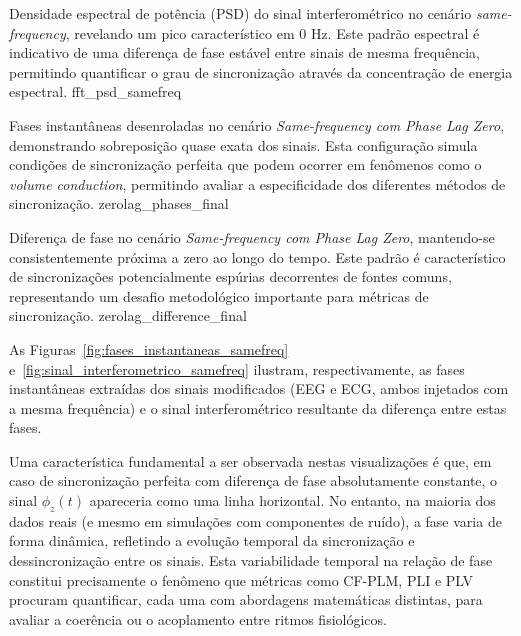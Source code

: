{Densidade espectral de potência (PSD) do sinal interferométrico no cenário \textit{same-frequency}, revelando um pico característico em 0 Hz. Este padrão espectral é indicativo de uma diferença de fase estável entre sinais de mesma frequência, permitindo quantificar o grau de sincronização através da concentração de energia espectral.}
{fft_psd_samefreq}

{Fases instantâneas desenroladas no cenário \textit{Same-frequency com Phase Lag Zero}, demonstrando sobreposição quase exata dos sinais. Esta configuração simula condições de sincronização perfeita que podem ocorrer em fenômenos como o \textit{volume conduction}, permitindo avaliar a especificidade dos diferentes métodos de sincronização.}
{zerolag_phases_final}

{Diferença de fase no cenário \textit{Same-frequency com Phase Lag Zero}, mantendo-se consistentemente próxima a zero ao longo do tempo. Este padrão é característico de sincronizações potencialmente espúrias decorrentes de fontes comuns, representando um desafio metodológico importante para métricas de sincronização.}
{zerolag_difference_final}

\clearpage

As Figuras~\ref{fig:fases_instantaneas_samefreq} e~\ref{fig:sinal_interferometrico_samefreq} ilustram, respectivamente, as fases instantâneas extraídas dos sinais modificados (EEG e ECG, ambos injetados com a mesma frequência) e o sinal interferométrico resultante da diferença entre estas fases.

Uma característica fundamental a ser observada nestas visualizações é que, em caso de sincronização perfeita com diferença de fase absolutamente constante, o sinal \(\phi_z(t)\) apareceria como uma linha horizontal. No entanto, na maioria dos dados reais (e mesmo em simulações com componentes de ruído), a fase varia de forma dinâmica, refletindo a evolução temporal da sincronização e dessincronização entre os sinais. Esta variabilidade temporal na relação de fase constitui precisamente o fenômeno que métricas como CF-PLM, PLI e PLV procuram quantificar, cada uma com abordagens matemáticas distintas, para avaliar a coerência ou o acoplamento entre ritmos fisiológicos.

